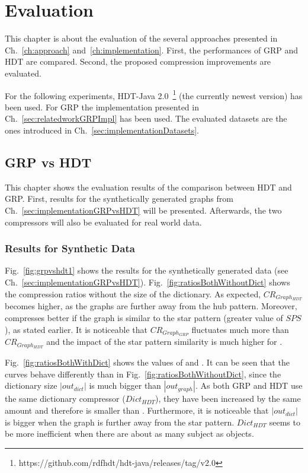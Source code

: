 \chapter{Evaluation}\label{ch:evaluation}

This chapter is about the evaluation of the several approaches presented in Ch.~\ref{ch:approach} and~\ref{ch:implementation}.  First, the performances of GRP and HDT are compared. Second, the proposed compression improvements are evaluated.

For the following experiments, HDT-Java 2.0~\footnote{\label{foot:1}https://github.com/rdfhdt/hdt-java/releases/tag/v2.0} (the currently newest version) has been used. For GRP the implementation presented in Ch.~\ref{sec:relatedworkGRPImpl} has been used. The evaluated datasets are the ones introduced in Ch.~\ref{sec:implementationDatasets}.

\section{GRP vs HDT}\label{sec:evaluationHDTvsGRP}

This chapter shows the evaluation results of the comparison between HDT and GRP. First, results for the synthetically generated graphs from Ch.~\ref{sec:implementationGRPvsHDT} will be presented. Afterwards, the two compressors will also be evaluated for real world data.


\subsection{Results for Synthetic Data}

Fig.~\ref{fig:grpvshdt1} shows the results for the synthetically generated data (see Ch.~\ref{sec:implementationGRPvsHDT}). Fig.~\ref{fig:ratiosBothWithoutDict} shows the compression ratios without the size of the dictionary. As expected, $CR_{Graph_{HDT}}$ becomes higher, as the graphs are further away from the hub pattern. Moreover, \GGRP{} compresses better if the graph is similar to the star pattern (greater value of $SPS$), as stated earlier. It is noticeable that $CR_{Graph_{GRP}}$ fluctuates much more than $CR_{Graph_{HDT}}$ and the impact of the star pattern similarity is much higher for \GGRP{}.

Fig.~\ref{fig:ratiosBothWithDict} shows the values of  and . It can be seen that the curves behave differently than in Fig.~\ref{fig:ratiosBothWithoutDict}, since the dictionary size $|out_{dict}|$ is much bigger than $|out_{graph}|$. As both GRP and HDT use the same dictionary compressor ($Dict_{HDT}$), they have been increased by the same amount and therefore  is smaller than . Furthermore, it is noticeable that $|out_{dict}|$ is bigger when the graph is further away from the star pattern. $Dict_{HDT}$ seems to be more inefficient when there are about as many subject as objects. 

